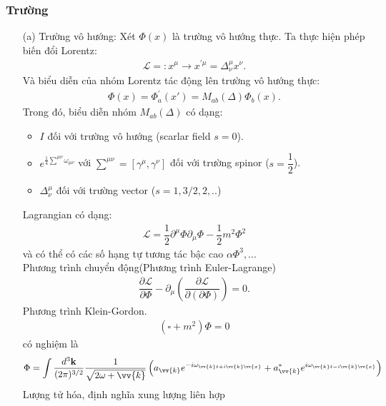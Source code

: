 \documentclass{report}
\newcommand{\f}[2]{\dfrac{#1}{#2}}
\begin{document}
\subsubsection*{Trường}
\begin{enumerate}
	\item[(a)] Trường vô hướng: Xét $\Phi(x)$ là trường vô hướng thực. Ta thực hiện phép biến đổi Lorentz:
	\begin{align*}
		\mathcal{L} =: x^{\mu} \rightarrow x^{'\mu} = \Delta_{\nu}^{\mu}x^{\nu}.
	\end{align*} 
	Và biểu diễn của nhóm Lorentz tác động lên trường vô hướng thực:
	\begin{align*}
		\Phi(x) = \Phi_{a}^{'}(x') = M_{ab}(\Delta) \Phi_{b}(x).
	\end{align*}
	Trong đó, biểu diễn nhóm $M_{ab}(\Delta)$ có dạng:
	\begin{itemize}
		\item $I$ đối với trường vô hướng (scarlar field $s = 0$).
		\item $e^{\frac{1}{4} \sum^{\mu\nu} \omega_{\mu\nu}}$ với $\sum^{\mu\nu} = \left[\gamma^{\mu}, \gamma^{\nu} \right]$ đối với trường spinor ($s = \f{1}{2}$).
		\item  $\Delta_{\nu}^{\mu}$ đối với trường vector ($s = 1,3/2 ,2 ,..$)
	\end{itemize}
	Lagrangian có dạng:
	\begin{align*}
		\mathcal{L} = \f{1}{2} \partial^{\mu} \Phi \partial_{\mu} \Phi - \f{1}{2} m^{2} \Phi^{2} \tag{1}
	\end{align*}
	và có thể có các số hạng tự tương tác bậc cao $\alpha \Phi^{3} ,...$\\
	Phương trình chuyển động(Phương trình Euler-Lagrange)
	\begin{align*}
		\f{\partial\mathcal{L}}{\partial\Phi} -\partial_{\mu} \left( \f{\partial \mathcal{L}}{\partial(\partial \Phi)} \right) = 0.
	\end{align*}
	Phương trình Klein-Gordon.
	\begin{align*}
		(\square + m^{2}) \Phi = 0
	\end{align*}
	có nghiệm là
	\begin{align*}
		\Phi = \int \f{d^{3} \mathbf{k}}{(2\pi)^{3/2}} \f{1}{\sqrt{2\omega+{\vv{k}}}} \left( a_{\vv{k}}e^{ -i \omega_{\vv{k}t + i \vv{k}\vv{x}}} + a_{\vv{k}}^{\ast} e^{ i \omega_{\vv{k}t - i \vv{k}\vv{x}} } \right)
	\end{align*}
	Lượng tử hóa, định nghĩa xung lượng liên hợp
	\begin{align*}

\end{align*}
\end{enumerate}
\end{document}
